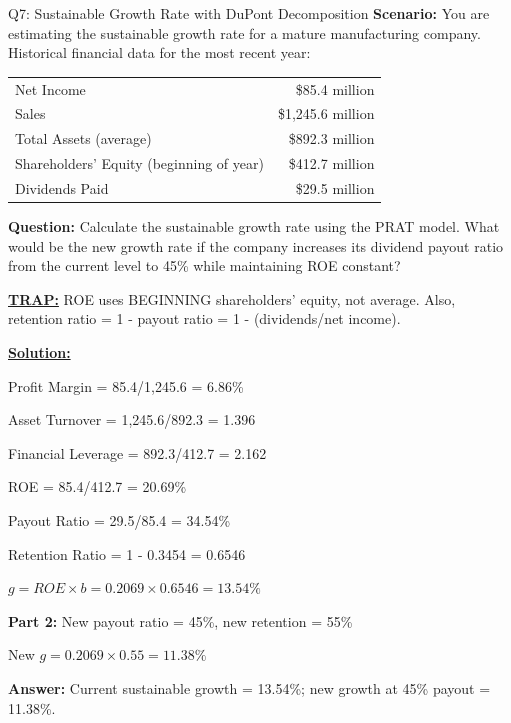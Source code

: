 \documentclass{beamer}
\renewcommand{\scriptsize}{\fontsize{6pt}{7pt}\selectfont}
\begin{document}
	\begin{frame}{Q7: Sustainable Growth Rate with DuPont Decomposition}
		\scriptsize
		\textbf{Scenario:} You are estimating the sustainable growth rate for a mature manufacturing company. Historical financial data for the most recent year:
		
		\begin{tabular}{lr}
			Net Income & \$85.4 million \\
			Sales & \$1,245.6 million \\
			Total Assets (average) & \$892.3 million \\
			Shareholders' Equity (beginning of year) & \$412.7 million \\
			Dividends Paid & \$29.5 million \\
		\end{tabular}
		
		\textbf{Question:} Calculate the sustainable growth rate using the PRAT model. What would be the new growth rate if the company increases its dividend payout ratio from the current level to 45\% while maintaining ROE constant?
		
		\vspace{2pt}
		\underline{\textbf{TRAP:}} ROE uses BEGINNING shareholders' equity, not average. Also, retention ratio = 1 - payout ratio = 1 - (dividends/net income).
		
		\vspace{4pt}
		\underline{\textbf{Solution:}}
		
		Profit Margin = 85.4/1,245.6 = 6.86\%
		
		Asset Turnover = 1,245.6/892.3 = 1.396
		
		Financial Leverage = 892.3/412.7 = 2.162
		
		\vspace{2pt}
		ROE = 85.4/412.7 = 20.69\%
		
		Payout Ratio = 29.5/85.4 = 34.54\%
		
		Retention Ratio = 1 - 0.3454 = 0.6546
		
		$g = ROE \times b = 0.2069 \times 0.6546 = 13.54\%$
		
		\vspace{2pt}
		\textbf{Part 2:} New payout ratio = 45\%, new retention = 55\%
		
		New $g = 0.2069 \times 0.55 = 11.38\%$
		
		\textbf{Answer:} Current sustainable growth = 13.54\%; new growth at 45\% payout = 11.38\%.
	\end{frame}
	
\end{document}
